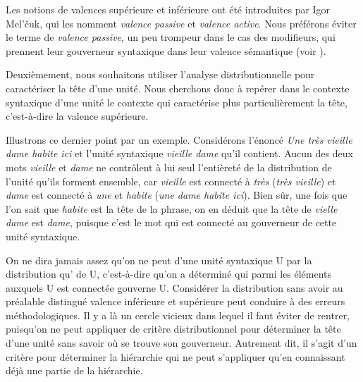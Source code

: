 Les notions de valences supérieure et inférieure ont été introduites par Igor Mel’čuk, qui les nomment \textit{valence passive} et \textit{valence active}. Nous préférons éviter le terme de \textit{valence passive}, un peu trompeur dans le cas des modifieurs, qui prennent leur gouverneur syntaxique dans leur valence sémantique (voir ).

Deuxièmement, nous souhaitons utiliser l’analyse distributionnelle pour caractériser la tête d’une unité. Nous cherchons donc à repérer dans le contexte syntaxique d’une unité le contexte qui caractérise plus particulièrement la tête, c’est-à-dire la valence supérieure.

Illustrons ce dernier point par un exemple. Considérons l’énoncé \textit{Une très vieille dame habite ici} et l’unité syntaxique \textit{vieille dame} qu’il contient. Aucun des deux mots \textit{vieille} et \textit{dame} ne contrôlent à lui seul l’entièreté de la distribution de l’unité qu’ils forment ensemble, car \textit{vieille} est connecté à \textit{très} (\textit{très vieille}) et \textit{dame} est connecté à \textit{une} et \textit{habite} (\textit{une dame habite ici}). Bien sûr, une fois que l’on sait que \textit{habite} est la tête de la phrase, on en déduit que la tête de \textit{vielle dame} est \textit{dame}, puisque c’est le mot qui est connecté au gouverneur de cette unité syntaxique.

On ne dira jamais assez qu’on ne peut  d’une unité syntaxique U par la distribution qu’  de U, c’est-à-dire qu’on a déterminé qui parmi les éléments auxquels U est connectée gouverne U. Considérer la distribution sans avoir au préalable distingué valence inférieure et supérieure peut conduire à des erreurs méthodologiques. Il y a là un cercle vicieux dans lequel il faut éviter de rentrer, puisqu’on ne peut appliquer de critère distributionnel pour déterminer la tête d’une unité sans savoir où se trouve son gouverneur. Autrement dit, il s’agit d’un critère pour déterminer la hiérarchie qui ne peut s’appliquer qu'en connaissant déjà une partie de la hiérarchie.

